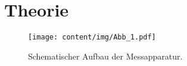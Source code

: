 \section{Theorie}
\label{sec:theorie}

    \begin{figure}
        \centering
        \texttt{[image: content/img/Abb\_1.pdf]}
        \caption{Schematischer Aufbau der Messapparatur. \cite{versuchsanleitung}}
        \label{fig:aufbau}
    \end{figure}

